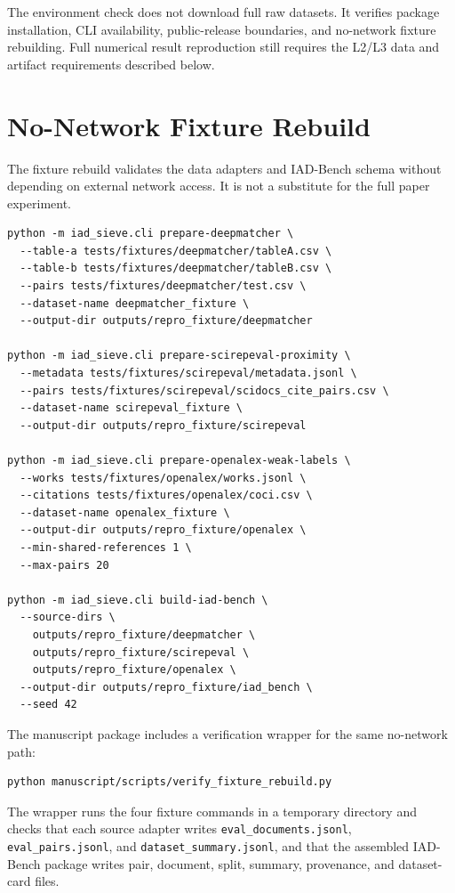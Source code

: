 \documentclass[11pt]{article}
\begin{document}
The environment check does not download full raw datasets. It verifies package installation, CLI availability, public-release boundaries, and no-network fixture rebuilding. Full numerical result reproduction still requires the L2/L3 data and artifact requirements described below.

\section{No-Network Fixture Rebuild}

The fixture rebuild validates the data adapters and IAD-Bench schema without depending on external network access. It is not a substitute for the full paper experiment.

\small
\begin{verbatim}
python -m iad_sieve.cli prepare-deepmatcher \
  --table-a tests/fixtures/deepmatcher/tableA.csv \
  --table-b tests/fixtures/deepmatcher/tableB.csv \
  --pairs tests/fixtures/deepmatcher/test.csv \
  --dataset-name deepmatcher_fixture \
  --output-dir outputs/repro_fixture/deepmatcher

python -m iad_sieve.cli prepare-scirepeval-proximity \
  --metadata tests/fixtures/scirepeval/metadata.jsonl \
  --pairs tests/fixtures/scirepeval/scidocs_cite_pairs.csv \
  --dataset-name scirepeval_fixture \
  --output-dir outputs/repro_fixture/scirepeval

python -m iad_sieve.cli prepare-openalex-weak-labels \
  --works tests/fixtures/openalex/works.jsonl \
  --citations tests/fixtures/openalex/coci.csv \
  --dataset-name openalex_fixture \
  --output-dir outputs/repro_fixture/openalex \
  --min-shared-references 1 \
  --max-pairs 20

python -m iad_sieve.cli build-iad-bench \
  --source-dirs \
    outputs/repro_fixture/deepmatcher \
    outputs/repro_fixture/scirepeval \
    outputs/repro_fixture/openalex \
  --output-dir outputs/repro_fixture/iad_bench \
  --seed 42
\end{verbatim}
\normalsize

The manuscript package includes a verification wrapper for the same no-network path:

\small
\begin{verbatim}
python manuscript/scripts/verify_fixture_rebuild.py
\end{verbatim}
\normalsize

The wrapper runs the four fixture commands in a temporary directory and checks that each source adapter writes \texttt{eval\_documents.jsonl}, \texttt{eval\_pairs.jsonl}, and \texttt{dataset\_summary.jsonl}, and that the assembled IAD-Bench package writes pair, document, split, summary, provenance, and dataset-card files.
\end{document}
